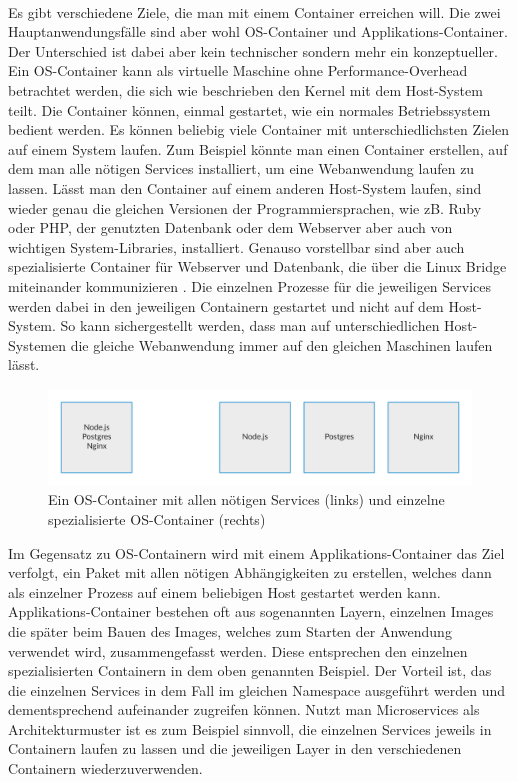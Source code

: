 \paragraph{}
Es gibt verschiedene Ziele, die man mit einem Container erreichen will. Die zwei Hauptanwendungsfälle sind aber wohl OS-Container und Applikations-Container. Der Unterschied ist dabei aber kein technischer sondern mehr ein konzeptueller.\\
Ein OS-Container kann als virtuelle Maschine ohne Performance-Overhead betrachtet werden, die sich wie beschrieben den Kernel mit dem Host-System teilt. Die Container können, einmal gestartet, wie ein normales Betriebssystem bedient werden. Es können beliebig viele Container mit unterschiedlichsten Zielen auf einem System laufen. Zum Beispiel könnte man einen Container erstellen, auf dem man alle nötigen Services installiert, um eine Webanwendung laufen zu lassen. Lässt man den Container auf einem anderen Host-System laufen, sind wieder genau die gleichen Versionen der Programmiersprachen, wie zB. Ruby oder PHP, der genutzten Datenbank oder dem Webserver aber auch von wichtigen System-Libraries, installiert. Genauso vorstellbar sind aber auch spezialisierte Container für Webserver und Datenbank, die über die Linux Bridge miteinander kommunizieren \cite{ocvsac}. Die einzelnen Prozesse für die jeweiligen Services werden dabei in den jeweiligen Containern gestartet und nicht auf dem Host-System. So kann sichergestellt werden, dass man auf unterschiedlichen Host-Systemen die gleiche Webanwendung immer auf den gleichen Maschinen laufen lässt.

\begin{figure}[!ht]
  \centering
  \includegraphics[width=1\textwidth]{images/4-os-specialized-containers.png}
  \caption{Ein OS-Container mit allen nötigen Services (links) und einzelne spezialisierte OS-Container (rechts) \cite{ocvsac}}
\end{figure}

Im Gegensatz zu OS-Containern wird mit einem Applikations-Container das Ziel verfolgt, ein Paket mit allen nötigen Abhängigkeiten zu erstellen, welches dann als einzelner Prozess auf einem beliebigen Host gestartet werden kann.
Applikations-Container bestehen oft aus sogenannten Layern, einzelnen Images die später beim Bauen des Images, welches zum Starten der Anwendung verwendet wird, zusammengefasst werden. Diese entsprechen den einzelnen spezialisierten Containern in dem oben genannten Beispiel. Der Vorteil ist, das die einzelnen Services in dem Fall im gleichen Namespace ausgeführt werden und dementsprechend aufeinander zugreifen können. Nutzt man Microservices als Architekturmuster ist es zum Beispiel sinnvoll, die einzelnen Services jeweils in Containern laufen zu lassen und die jeweiligen Layer in den verschiedenen Containern wiederzuverwenden.

